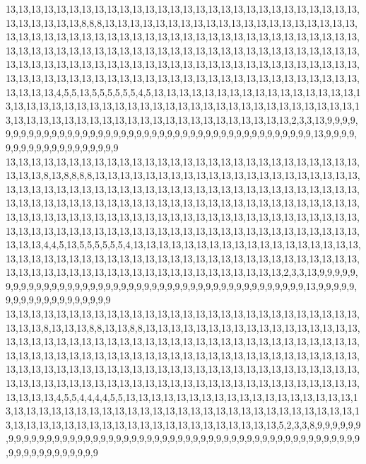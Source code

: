 13,13,13,13,13,13,13,13,13,13,13,13,13,13,13,13,13,13,13,13,13,13,13,13,13,13,13,13,13,13,13,13,13,13,8,8,8,13,13,13,13,13,13,13,13,13,13,13,13,13,13,13,13,13,13,13,13,13,13,13,13,13,13,13,13,13,13,13,13,13,13,13,13,13,13,13,13,13,13,13,13,13,13,13,13,13,13,13,13,13,13,13,13,13,13,13,13,13,13,13,13,13,13,13,13,13,13,13,13,13,13,13,13,13,13,13,13,13,13,13,13,13,13,13,13,13,13,13,13,13,13,13,13,13,13,13,13,13,13,13,13,13,13,13,13,13,13,13,13,13,13,13,13,13,13,13,13,13,13,13,13,13,13,13,13,13,13,13,13,13,13,13,13,4,5,5,13,5,5,5,5,5,5,4,5,13,13,13,13,13,13,13,13,13,13,13,13,13,13,13,13,13,13,13,13,13,13,13,13,13,13,13,13,13,13,13,13,13,13,13,13,13,13,13,13,13,13,13,13,13,13,13,13,13,13,13,13,13,13,13,13,13,13,13,13,13,13,13,13,13,13,13,2,3,3,13,9,9,9,9,9,9,9,9,9,9,9,9,9,9,9,9,9,9,9,9,9,9,9,9,9,9,9,9,9,9,9,9,9,9,9,9,9,9,9,9,9,9,9,9,13,9,9,9,9,9,9,9,9,9,9,9,9,9,9,9,9,9,9,9
13,13,13,13,13,13,13,13,13,13,13,13,13,13,13,13,13,13,13,13,13,13,13,13,13,13,13,13,13,13,13,8,13,8,8,8,8,13,13,13,13,13,13,13,13,13,13,13,13,13,13,13,13,13,13,13,13,13,13,13,13,13,13,13,13,13,13,13,13,13,13,13,13,13,13,13,13,13,13,13,13,13,13,13,13,13,13,13,13,13,13,13,13,13,13,13,13,13,13,13,13,13,13,13,13,13,13,13,13,13,13,13,13,13,13,13,13,13,13,13,13,13,13,13,13,13,13,13,13,13,13,13,13,13,13,13,13,13,13,13,13,13,13,13,13,13,13,13,13,13,13,13,13,13,13,13,13,13,13,13,13,13,13,13,13,13,13,13,13,13,13,13,13,4,4,5,13,5,5,5,5,5,5,4,13,13,13,13,13,13,13,13,13,13,13,13,13,13,13,13,13,13,13,13,13,13,13,13,13,13,13,13,13,13,13,13,13,13,13,13,13,13,13,13,13,13,13,13,13,13,13,13,13,13,13,13,13,13,13,13,13,13,13,13,13,13,13,13,13,13,13,13,2,3,3,13,9,9,9,9,9,9,9,9,9,9,9,9,9,9,9,9,9,9,9,9,9,9,9,9,9,9,9,9,9,9,9,9,9,9,9,9,9,9,9,9,9,9,9,9,13,9,9,9,9,9,9,9,9,9,9,9,9,9,9,9,9,9,9,9
13,13,13,13,13,13,13,13,13,13,13,13,13,13,13,13,13,13,13,13,13,13,13,13,13,13,13,13,13,13,13,8,13,13,13,8,8,13,13,8,8,13,13,13,13,13,13,13,13,13,13,13,13,13,13,13,13,13,13,13,13,13,13,13,13,13,13,13,13,13,13,13,13,13,13,13,13,13,13,13,13,13,13,13,13,13,13,13,13,13,13,13,13,13,13,13,13,13,13,13,13,13,13,13,13,13,13,13,13,13,13,13,13,13,13,13,13,13,13,13,13,13,13,13,13,13,13,13,13,13,13,13,13,13,13,13,13,13,13,13,13,13,13,13,13,13,13,13,13,13,13,13,13,13,13,13,13,13,13,13,13,13,13,13,13,13,13,13,13,13,13,13,13,13,4,5,5,4,4,4,4,5,5,13,13,13,13,13,13,13,13,13,13,13,13,13,13,13,13,13,13,13,13,13,13,13,13,13,13,13,13,13,13,13,13,13,13,13,13,13,13,13,13,13,13,13,13,13,13,13,13,13,13,13,13,13,13,13,13,13,13,13,13,13,13,13,13,13,13,13,13,5,2,3,3,8,9,9,9,9,9,9,9,9,9,9,9,9,9,9,9,9,9,9,9,9,9,9,9,9,9,9,9,9,9,9,9,9,9,9,9,9,9,9,9,9,9,9,9,9,9,9,9,9,9,9,9,9,9,9,9,9,9,9,9,9,9,9,9,9
